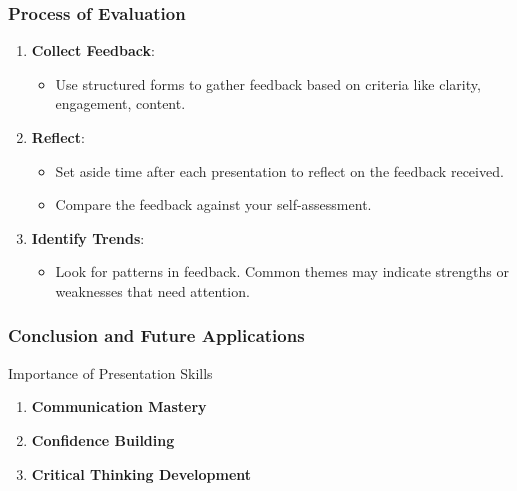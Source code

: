 \documentclass[aspectratio=169]{beamer}
\begin{document}
\begin{frame}[fragile]
    \frametitle{Process of Evaluation}
    \begin{enumerate}
        \item \textbf{Collect Feedback}:
            \begin{itemize}
                \item Use structured forms to gather feedback based on criteria like clarity, engagement, content.
            \end{itemize}
        \item \textbf{Reflect}:
            \begin{itemize}
                \item Set aside time after each presentation to reflect on the feedback received.
                \item Compare the feedback against your self-assessment.
            \end{itemize}
        \item \textbf{Identify Trends}:
            \begin{itemize}
                \item Look for patterns in feedback. Common themes may indicate strengths or weaknesses that need attention.
            \end{itemize}
    \end{enumerate}
\end{frame}

\begin{frame}[fragile]
    \frametitle{Conclusion and Future Applications}
    \begin{block}{Importance of Presentation Skills}
        \begin{enumerate}
            \item \textbf{Communication Mastery}
            \item \textbf{Confidence Building}
            \item \textbf{Critical Thinking Development}
        \end{enumerate}
    \end{block}
\end{frame}
\end{document}
